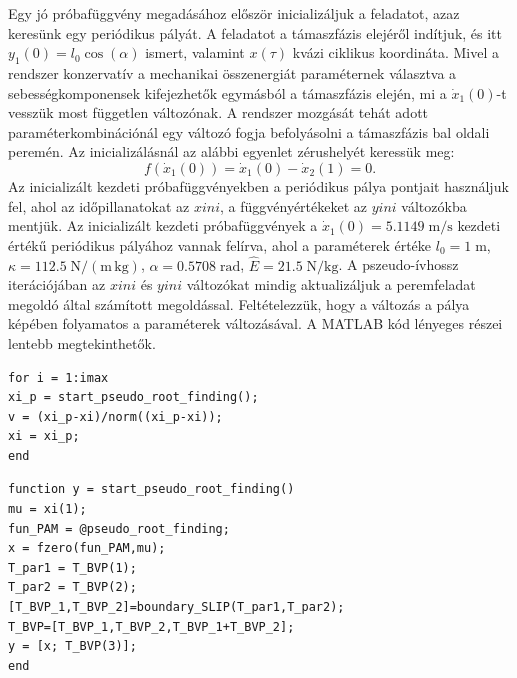Egy jó próbafüggvény megadásához először inicializáljuk a feladatot, azaz keresünk egy periódikus pályát.
A feladatot a támaszfázis elejéről indítjuk, és itt $y_1(0) = l_0\cos(\alpha)$ ismert, valamint $x(\tau)$ kvázi ciklikus koordináta.
Mivel a rendszer konzervatív a mechanikai összenergiát paraméternek választva a sebességkomponensek kifejezhetők egymásból a támaszfázis elején, mi a $\dot{x}_1(0)$-t vesszük most független változónak.
A rendszer mozgását tehát adott paraméterkombinációnál egy változó fogja befolyásolni a támaszfázis bal oldali peremén.
Az inicializálásnál az alábbi egyenlet zérushelyét keressük meg:
\begin{equation}
	f(\dot{x}_1(0)) = \dot{x}_1(0) - \dot{x}_2(1) = 0.
\end{equation}
Az inicializált kezdeti próbafüggvényekben a periódikus pálya pontjait hasz\-nál\-juk fel, ahol az időpillanatokat az $xini$, a függvényértékeket az $yini$ változókba mentjük.
Az inicializált kezdeti próbafüggvények a $\dot{x}_1(0) = 5.1149\; \mathrm{m/s}$ kezdeti értékű pe\-ri\-ó\-di\-kus pályához vannak felírva, ahol a paraméterek értéke $l_0 = 1 \; \mathrm{m}$, $\kappa = 112.5\;\mathrm{N/(m\,kg)}$, $\alpha = 0.5708 \;\mathrm{rad}$, $\hat{E} = 21.5 \;\mathrm{N/kg}$.
A pszeudo-ívhossz iterációjában az $xini$ és $yini$ változókat mindig aktualizáljuk a peremfeladat megoldó által számított megoldással.
Fel\-té\-te\-lez\-zük, hogy a változás a pálya képében folyamatos a paraméterek változásával. 
A MATLAB kód lényeges részei lentebb megtekinthetők.
\begin{lstlisting}
for i = 1:imax	
xi_p = start_pseudo_root_finding();	
v = (xi_p-xi)/norm((xi_p-xi));	
xi = xi_p;
end
\end{lstlisting}
\begin{lstlisting}
function y = start_pseudo_root_finding()
mu = xi(1);	
fun_PAM = @pseudo_root_finding;
x = fzero(fun_PAM,mu);	
T_par1 = T_BVP(1);
T_par2 = T_BVP(2);
[T_BVP_1,T_BVP_2]=boundary_SLIP(T_par1,T_par2);
T_BVP=[T_BVP_1,T_BVP_2,T_BVP_1+T_BVP_2];	
y = [x; T_BVP(3)];
end
\end{lstlisting}


